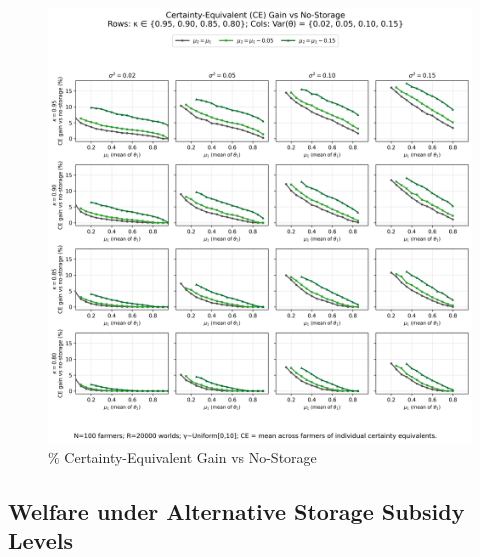 \begin{figure}[ht!]
    \centering
    \includegraphics[width=\linewidth]{model_figures/cegain_grid_4x4.png}
    \caption{$\%$ Certainty-Equivalent Gain vs No-Storage}
    \label{fig:CE gains}
\end{figure}



\subsection{Welfare under Alternative Storage Subsidy Levels}



